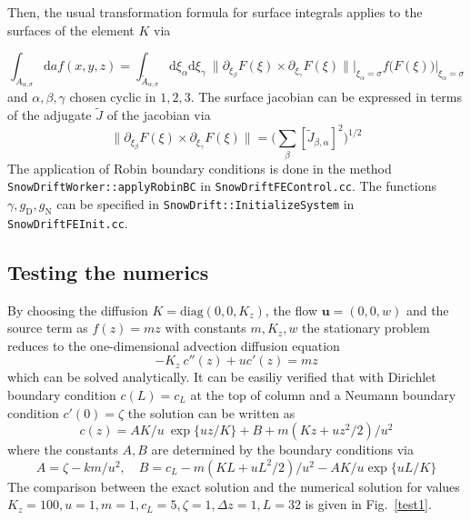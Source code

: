 \documentclass[12pt]{report}
\begin{document}
Then, the usual transformation formula for surface integrals applies
to the surfaces of the element $K$ via

\begin{equation}
  \int_{{A}_{\alpha,\sigma}}\mathrm{d}a f(x,y,z)
  =
  \int_{\tilde{A}_{\alpha,\sigma}}
  \mathrm{d}\xi_{\alpha}
  \mathrm{d}\xi_{\gamma}\
  \|\partial_{\xi_{\beta}} F(\xi) \times \partial_{\xi_{\gamma}}
  F(\xi)\|\Big|_{\xi_{\alpha}=\sigma}
  f \bigl(F(\xi)\bigr)\Big|_{\xi_{\alpha}=\sigma}
\end{equation}
and $\alpha,\beta,\gamma$ chosen cyclic in $1,2,3$.  The surface
jacobian can be expressed in terms of the adjugate $\tilde{J}$ of the
jacobian via
\begin{equation}
  \|\partial_{\xi_{\beta}} F(\xi) \times \partial_{\xi_{\gamma}} F(\xi)\| 
  = \Big( \sum_{\beta} \left[\tilde{J}_{\beta,\alpha}\right]^2 \Big)^{1/2}
\end{equation}
The application of Robin boundary conditions is done in the method\\
\verb+SnowDriftWorker::applyRobinBC+ in \verb+SnowDriftFEControl.cc+.
The functions $\gamma,g_{\mathrm{D}},g_{\mathrm{N}}$ can be specified
in \verb+SnowDrift::InitializeSystem+ in \\\verb+SnowDriftFEInit.cc+.

\subsection{Testing the numerics}
By choosing the diffusion $K=\mathrm{diag}(0,0,K_z)$, the flow
$\mathbf{u}=(0,0,w)$ and the source term as $f(z)=mz$ with
constants $m,K_z,w$ the stationary problem reduces to the one-dimensional
advection diffusion equation
\begin{equation}
  \label{eq:1ddiff}
  -K_z\ c''(z)+uc'(z)=mz
\end{equation}
which can be solved analytically. It can be easiliy verified that with
Dirichlet boundary condition $c(L)=c_L$ at the top of column and a
Neumann boundary condition $c'(0)=\zeta$ the solution can be written
as
\begin{equation}
  \label{eq:1ddiff}
  c(z)=AK/u\ \exp\{uz/K\}+B+m(Kz+uz^2/2)/u^2
\end{equation}
where the constants $A,B$ are determined by the boundary conditions
via
\begin{equation}
  \label{eq:1ddiff}
  A=\zeta-km/u^2,\quad B=c_L-m(KL+uL^2/2)/u^2-AK/u\exp\{uL/K\}
\end{equation}
The comparison between the exact solution and the numerical solution
for values $K_z=100,u=1,m=1,c_L=5,\zeta=1,\Delta z=1,L=32$ is given in
Fig.\ \ref{test1}.
\end{document}
